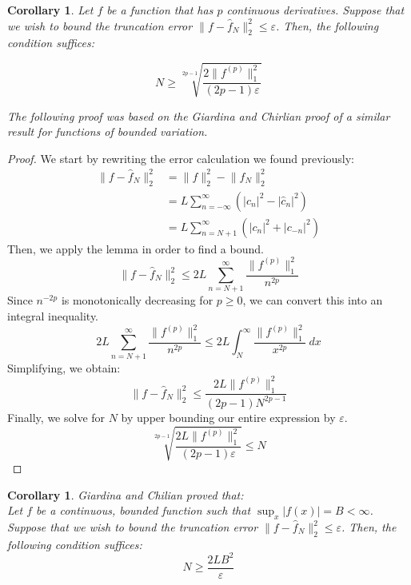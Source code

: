 \documentclass{article}
\newtheorem{corollary}[theorem]{Corollary}
\begin{document}
\begin{corollary}
    Let $f$ be a function that has $p$ continuous derivatives. Suppose that we wish to bound the truncation error $\lVert f - \hat{f}_N \rVert_2^2 \leq \varepsilon$. Then, the following condition suffices:
    
    \begin{equation}
        N \geq \sqrt[2p-1]{\frac{2\lVert f^{(p)} \rVert_1^2}{(2p - 1)\varepsilon}}
    \end{equation}
    
    The following proof was based on the Giardina and Chirlian proof of a similar result for functions of bounded variation.
\end{corollary}
\begin{proof}
    We start by rewriting the error calculation we found previously:
    \begin{align}
        \lVert f - \hat{f}_N \rVert_2^2
        &= \lVert f \rVert_2^2 - \lVert \hat{f}_N \rVert_2^2 \\
        &= L \sum_{n=-\infty}^{\infty} (|c_n|^2 - |\hat{c}_n|^2) \\
        &= L \sum_{n=N+1}^{\infty} (|c_n|^2 + |c_{-n}|^2)
    \end{align}
    Then, we apply the lemma in order to find a bound.
    \begin{equation}
        \lVert f - \hat{f}_N \rVert_2^2 \leq 2L  \sum_{n=N+1}^{\infty} \frac{\lVert f^{(p)} \rVert_1^2}{n^{2p}}
    \end{equation}
    Since $n^{-2p}$ is monotonically decreasing for $p \geq 0$, we can convert this into an integral inequality.
    \begin{equation}
        2L \sum_{n=N+1}^{\infty} \frac{\lVert f^{(p)} \rVert_1^2}{n^{2p}} \leq 2L \int_{N}^{\infty} \frac{\lVert f^{(p)} \rVert_1^2}{x^{2p}}\ dx 
    \end{equation}
    Simplifying, we obtain:
    \begin{equation}
        \lVert f - \hat{f}_N \rVert_2^2 \leq \frac{2L \lVert f^{(p)} \rVert_1^2}{(2p - 1)N^{2p - 1}}
    \end{equation}
    Finally, we solve for $N$ by upper bounding our entire expression by $\varepsilon$.
    \begin{equation}
        \sqrt[2p-1]{\frac{2L \lVert f^{(p)} \rVert_1^2}{(2p - 1)\varepsilon}} \leq N
    \end{equation}
\end{proof}

\begin{corollary}
    Giardina and Chilian proved that:\\
    Let $f$ be a continuous, bounded function such that $\sup_x |f(x)| = B < \infty$. Suppose that we wish to bound the truncation error $\lVert f -\hat{f}_N \rVert_2^2 \leq \varepsilon$.  Then, the following condition suffices:
    \begin{equation}
        N \geq \frac{2L B^2}{\varepsilon}
    \end{equation}
\end{corollary}
\end{document}

